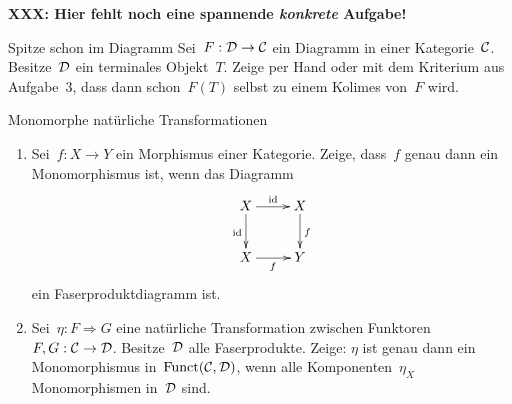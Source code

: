 \documentclass{pizzablatt}
\begin{document}

\textbf{XXX: Hier fehlt noch eine spannende \emph{konkrete} Aufgabe!}

\begin{aufgabe}{Spitze schon im Diagramm}
Sei~$F:\mathcal{D} \to \mathcal{C}$ ein Diagramm in einer Kategorie~$\mathcal{C}$. Besitze~$\mathcal{D}$ ein
terminales Objekt~$T$.
Zeige per Hand oder mit dem Kriterium aus Aufgabe~3, dass dann
schon~$F(T)$ selbst zu einem Kolimes von~$F$ wird.
\end{aufgabe}

\begin{aufgabe}{Monomorphe natürliche Transformationen}
\begin{enumerate}
\item Sei~$f:X \to Y$ ein Morphismus einer Kategorie. Zeige, dass~$f$ genau
dann ein Monomorphismus ist, wenn das Diagramm
\[ \xymatrix{
  X \ar[r]^\id \ar[d]_\id & X \ar[d]^f \\
  X \ar[r]_f & Y
} \]
ein Faserproduktdiagramm ist.
\item Sei~$\eta : F \Rightarrow G$ eine natürliche Transformation zwischen
Funktoren $F, G : \mathcal{C} \to \mathcal{D}$. Besitze~$\mathcal{D}$ alle Faserprodukte. Zeige: $\eta$
ist genau dann ein Monomorphismus in~$\mathrm{Funct}(\mathcal{C},\mathcal{D})$, wenn alle
Komponenten~$\eta_X$ Monomorphismen in~$\mathcal{D}$ sind.
\end{enumerate}
\end{aufgabe}
\end{document}
